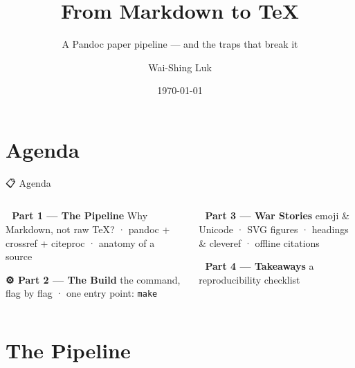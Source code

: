 \documentclass[
  10pt,
  ignorenonframetext,
  serif,
  aspectratio=169]{beamer}
\title{\texorpdfstring{From Markdown to TeX}{From Markdown to TeX}}
\subtitle{\texorpdfstring{A Pandoc paper pipeline --- and the traps that
break it}{A Pandoc paper pipeline --- and the traps that break it}}
\author{\texorpdfstring{Wai-Shing Luk}{Wai-Shing Luk}}
\date{\today}
\institute{Fudan University}
\begin{document}
\frame{\titlepage}

\section{Agenda}\label{agenda}

\begin{frame}[fragile]{📋 Agenda}
\protect{}\label{agenda-1}
\begin{columns}[T]
\begin{column}{0.47\linewidth}
\textbf{🔧 Part 1 --- The Pipeline} Why Markdown, not raw TeX? · pandoc
+ crossref + citeproc · anatomy of a source

\textbf{⚙️ Part 2 --- The Build} the command, flag by flag · one entry
point: \texttt{make}
\end{column}

\begin{column}{0.47\linewidth}
\textbf{🐛 Part 3 --- War Stories} emoji \& Unicode · SVG figures ·
headings \& cleveref · offline citations

\textbf{🎯 Part 4 --- Takeaways} a reproducibility checklist
\end{column}
\end{columns}
\end{frame}

\section{The Pipeline}\label{the-pipeline}
\end{document}
